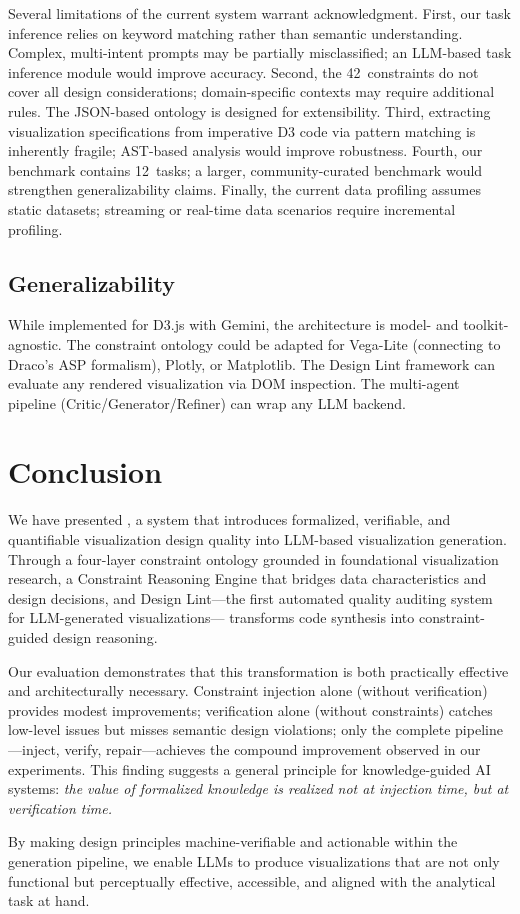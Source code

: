 Several limitations of the current system warrant acknowledgment.
First, our task inference relies on keyword matching rather than semantic understanding. Complex, multi-intent prompts may be partially misclassified; an LLM-based task inference module would improve accuracy.
Second, the 42~constraints do not cover all design considerations; domain-specific contexts may require additional rules. The JSON-based ontology is designed for extensibility.
Third, extracting visualization specifications from imperative D3 code via pattern matching is inherently fragile; AST-based analysis would improve robustness.
Fourth, our benchmark contains 12~tasks; a larger, community-curated benchmark would strengthen generalizability claims.
Finally, the current data profiling assumes static datasets; streaming or real-time data scenarios require incremental profiling.

\subsection{Generalizability}

While implemented for D3.js with Gemini, the architecture is model- and toolkit-agnostic. The constraint ontology could be adapted for Vega-Lite (connecting to Draco's ASP formalism), Plotly, or Matplotlib. The Design Lint framework can evaluate any rendered visualization via DOM inspection. The multi-agent pipeline (Critic/Generator/Refiner) can wrap any LLM backend.


\section{Conclusion}

We have presented \sysname{}, a system that introduces formalized, verifiable, and quantifiable visualization design quality into LLM-based visualization generation. Through a four-layer constraint ontology grounded in foundational visualization research, a Constraint Reasoning Engine that bridges data characteristics and design decisions, and Design Lint---the first automated quality auditing system for LLM-generated visualizations---\sysname{} transforms code synthesis into constraint-guided design reasoning.

Our evaluation demonstrates that this transformation is both practically effective and architecturally necessary. Constraint injection alone (without verification) provides modest improvements; verification alone (without constraints) catches low-level issues but misses semantic design violations; only the complete pipeline---inject, verify, repair---achieves the compound improvement observed in our experiments. This finding suggests a general principle for knowledge-guided AI systems: \textit{the value of formalized knowledge is realized not at injection time, but at verification time.}

By making design principles machine-verifiable and actionable within the generation pipeline, we enable LLMs to produce visualizations that are not only functional but perceptually effective, accessible, and aligned with the analytical task at hand.
